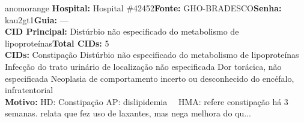 \documentclass[a4paper,10pt]{article}
\begin{document}
\begin{anomalycard}[Interna\c{c}\~{a}o \#121140 | Pac. \#100014 | ALTO (z=3.77) | LOS: 13d | 10/03/2026\,$\to$\,—]{anomorange}
\textbf{Hospital:} Hospital \#42452\quad \textbf{Fonte:} GHO-BRADESCO\quad \textbf{Senha:} kau2gt1\quad \textbf{Guia:} ---\\

\textbf{CID Principal:} {\small Distúrbio não especificado do metabolismo de lipoproteínas}\quad\textbf{Total CIDs:} 5\\

\textbf{CIDs:} {\scriptsize Constipação \textbar{} Distúrbio não especificado do metabolismo de lipoproteínas \textbar{} Infecção do trato urinário de localização não especificada \textbar{} Dor torácica, não especificada \textbar{} Neoplasia de comportamento incerto ou desconhecido do encéfalo, infratentorial}\\

\textbf{Motivo:} {\scriptsize HD: Constipação  AP: dislipidemia   HMA: refere constipação há 3 semanas. relata que fez uso de laxantes, mas nega melhora do qu...}\\



\end{anomalycard}
\end{document}
